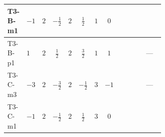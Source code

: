 \documentclass[8pt]{article}
\begin{document}
\begin{landscape}
\begin{longtable}{@{}llcccccc >{\raggedright\arraybackslash}p{0.21\linewidth} >{\raggedright\arraybackslash}p{0.21\linewidth} >{\raggedright\arraybackslash}p{0.21\linewidth}@{}}
T3-B-m1 & $-1$ & $2$ & $-\frac{1}{2}$ & $2$ & $\frac{1}{2}$ & $1$ & $0$ & \scriptsize\adjustbox{max width=\linewidth}{$\begin{gathered} +\frac{3 {g_1}^4}{4}\end{gathered}$} & \scriptsize\adjustbox{max width=\linewidth}{$\begin{gathered} +\frac{3 {\lambda_{12}^{(A)}}^2}{4}\end{gathered}$} & \scriptsize\adjustbox{max width=\linewidth}{$\begin{gathered} +{\lambda_{10}} \left(\frac{3}{2} \operatorname{Tr}\!\left({y_1}\,\left({y_2}\right)^{\dagger}\right)+9 (\left({\lambda_{10}}\right)^{*}+\left({\lambda_{11}}\right)^{*})\right) \\ +{\lambda_{11}} \left(\frac{3}{2} \operatorname{Tr}\!\left({y_1}\,\left({y_2}\right)^{\dagger}\right)+9 (\left({\lambda_{10}}\right)^{*}+\left({\lambda_{11}}\right)^{*})\right)\end{gathered}$} \\
\midrule
T3-B-p1 & $1$ & $2$ & $\frac{1}{2}$ & $2$ & $\frac{3}{2}$ & $1$ & $1$ & \scriptsize\adjustbox{max width=\linewidth}{$\begin{gathered} +\frac{27 {g_1}^4}{4}\end{gathered}$} & \scriptsize\adjustbox{max width=\linewidth}{$\begin{gathered} +\frac{3 {\lambda_{12}^{(A)}}^2}{4}\end{gathered}$} & --- \\
\midrule
T3-C-m3 & $-3$ & $2$ & $-\frac{3}{2}$ & $2$ & $-\frac{1}{2}$ & $3$ & $-1$ & \scriptsize\adjustbox{max width=\linewidth}{$\begin{gathered} +\frac{27 {g_1}^4}{4}\end{gathered}$} & \scriptsize\adjustbox{max width=\linewidth}{$\begin{gathered} +\frac{3 {\lambda_{12}^{(A)}}^2}{4}\end{gathered}$} & --- \\
\midrule
T3-C-m1 & $-1$ & $2$ & $-\frac{1}{2}$ & $2$ & $\frac{1}{2}$ & $3$ & $0$ & \scriptsize\adjustbox{max width=\linewidth}{$\begin{gathered} +\frac{3 {g_1}^4}{4}\end{gathered}$} & \scriptsize\adjustbox{max width=\linewidth}{$\begin{gathered} +\frac{3 {\lambda_{12}^{(A)}}^2}{4}\end{gathered}$} & \scriptsize\adjustbox{max width=\linewidth}{$\begin{gathered} +{\lambda_{10}} \left(\frac{9}{4} \operatorname{Tr}\!\left({y_1}\,\left({y_2}\right)^{\dagger}\right)+9 (\left({\lambda_{10}}\right)^{*}+\left({\lambda_{11}}\right)^{*})\right) \\ +{\lambda_{11}} \left(\frac{9}{4} \operatorname{Tr}\!\left({y_1}\,\left({y_2}\right)^{\dagger}\right)+9 (\left({\lambda_{10}}\right)^{*}+\left({\lambda_{11}}\right)^{*})\right)\end{gathered}$} \\

\end{longtable}
\end{landscape}
\end{document}
